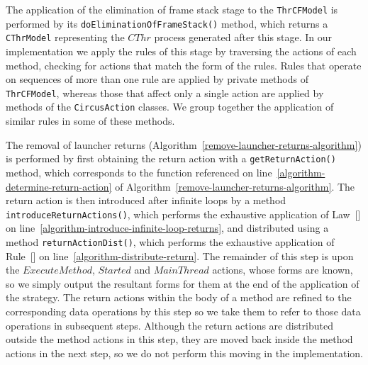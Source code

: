 The application of the elimination of frame stack stage to the
\texttt{ThrCFModel} is performed by its
\texttt{doEliminationOfFrameStack()} method, which returns a
\texttt{CThrModel} representing the $CThr$ process generated after
this stage.
In our implementation we apply the rules of this stage by traversing
the actions of each method, checking for actions that match the form
of the rules.
Rules that operate on sequences of more than one rule are applied by
private methods of \texttt{ThrCFModel}, whereas those that affect only
a single action are applied by methods of the \texttt{CircusAction}
classes.
We group together the application of similar rules in some of these
methods.

The removal of launcher returns
(Algorithm~\ref{remove-launcher-returns-algorithm}) is performed by
first obtaining the return action with a \texttt{getReturnAction()}
method, which corresponds to the  function
referenced on line~\ref{algorithm-determine-return-action} of
Algorithm~\ref{remove-launcher-returns-algorithm}.
The return action is then introduced after infinite loops by a
method \texttt{introduceReturnActions()}, which performs the
exhaustive application of Law~[] on
line~\ref{algorithm-introduce-infinite-loop-returns}, and distributed
using a method \texttt{returnActionDist()}, which performs the
exhaustive application of Rule~[] on
line~\ref{algorithm-distribute-return}.
The remainder of this step is upon the $ExecuteMethod$, $Started$ and
$MainThread$ actions, whose forms are known, so we simply output the
resultant forms for them at the end of the application of the
strategy.
The return actions within the body of a method are refined to the
corresponding data operations by this step so we take them to refer to
those data operations in subsequent steps.
Although the return actions are distributed outside the method actions
in this step, they are moved back inside the method actions in the
next step, so we do not perform this moving in the implementation.

